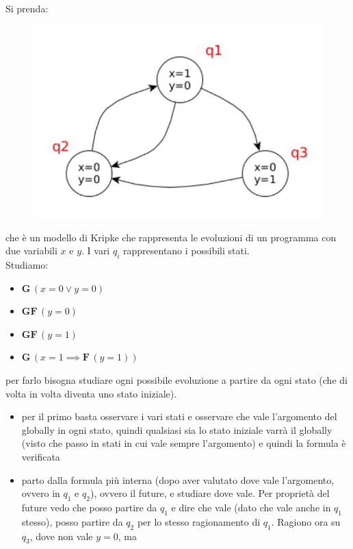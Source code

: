 \begin{esempio}
  Si prenda:
  \begin{figure}[H]
    \centering
    \includegraphics[scale = 0.4]{img/kri.jpg}
  \end{figure}
  che è un modello di Kripke che rappresenta le evoluzioni di un programma con
  due variabili $x$ e $y$. I vari $q_i$ rappresentano i possibili stati.\\
  Studiamo:
  \begin{itemize}
    \item $\mathbf{G}\,(x=0\lor y=0)$
    \item $\mathbf{GF}\,(y=0)$
    \item $\mathbf{GF}\,(y=1)$
    \item $\mathbf{G}\,(x=1\implies \mathbf{F}\,(y=1))$
  \end{itemize}
  per farlo bisogna studiare ogni possibile evoluzione a partire da ogni stato
  (che di volta in volta diventa uno stato iniziale).
  \begin{itemize}
    \item per il primo basta osservare i vari stati e osservare che vale
    l'argomento del globally in ogni stato, quindi qualsiasi sia lo stato
    iniziale varrà il globally (visto che passo in stati in cui vale sempre
    l'argomento) e quindi la formula è verificata
    \item parto dalla formula più interna (dopo aver valutato dove vale
    l'argomento, ovvero in $q_1$ e $q_2$), ovvero il future, e studiare dove
    vale. Per proprietà del future vedo che posso partire da $q_1$ e dire che
    vale (dato che vale anche in $q_1$ stesso), posso partire da $q_2$ per lo
    stesso ragionamento di $q_1$. Ragiono ora su $q_3$, dove non vale $y=0$, ma

\end{itemize}
\end{esempio}
